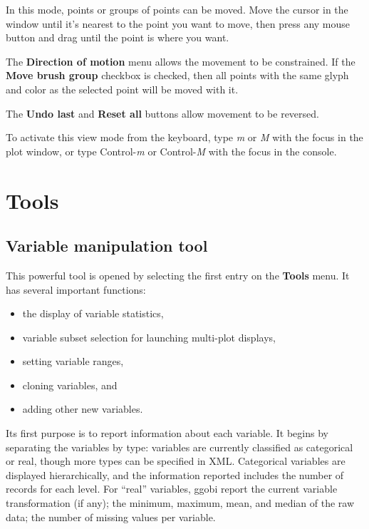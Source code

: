 \documentclass[11pt]{article}
\begin{document}
In this mode, points or groups of points can be moved.  Move
the cursor in the window until it's nearest to the point you
want to move, then press any mouse button and drag until the
point is where you want.

The {\bf Direction of motion} menu allows the movement to be
constrained.  If the {\bf Move brush group} checkbox is
checked, then all points with the same glyph and color as
the selected point will be moved with it.

The {\bf Undo last} and {\bf Reset all} buttons allow movement
to be reversed.

To activate this view mode from the keyboard, type {\em m} or {\em M}
with the focus in the plot window, or type Control-{\em m} or
Control-{\em M} with the focus in the console.

\newpage
\section{Tools}
\label{Tools}

\subsection{Variable manipulation tool}
\label{slbl:VarManip}

This powerful tool is opened by selecting the first entry on the
{\bf Tools} menu.  It has several important functions:
\begin{itemize} \itemsep 0em
\item the display of variable statistics,
\item variable subset selection for launching multi-plot displays,
\item setting variable ranges,
\item cloning variables, and
\item adding other new variables.
\end{itemize}

Its first purpose is to report information about each variable.
It begins by separating the variables by type: variables are
currently classified as categorical or real, though more types
can be specified in XML.  Categorical variables are displayed
hierarchically, and the information reported includes the number
of records for each level.  For ``real'' variables, ggobi report
the current variable transformation (if any); the minimum,
maximum, mean, and median of the raw data; the number of missing values
per variable.
\end{document}
